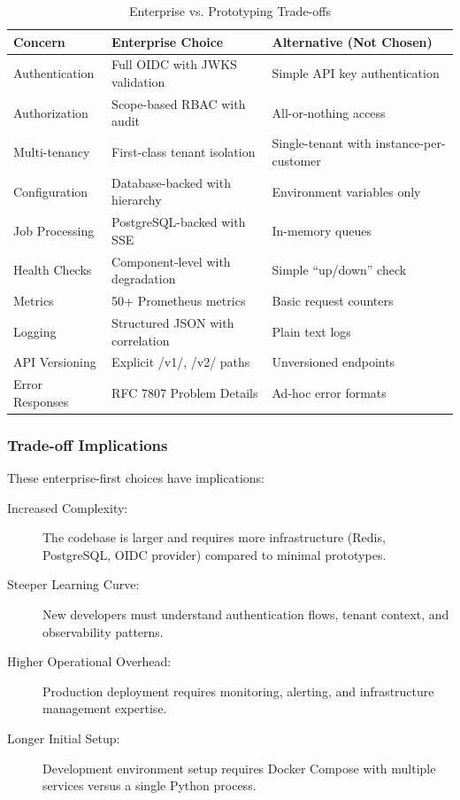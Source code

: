\documentclass[a4paper,twoside]{sapthesis}
\begin{document}
\begin{table}[htbp]
\centering
\caption{Enterprise vs. Prototyping Trade-offs}
\label{tab:enterprise-tradeoffs}
\small
\begin{tabularx}{\textwidth}{|l|X|X|}
\hline
\textbf{Concern} & \textbf{Enterprise Choice} & \textbf{Alternative (Not Chosen)} \\
\midrule
Authentication & Full OIDC with JWKS validation & Simple API key authentication \\
\midrule
Authorization & Scope-based RBAC with audit & All-or-nothing access \\
\midrule
Multi-tenancy & First-class tenant isolation & Single-tenant with instance-per-customer \\
\midrule
Configuration & Database-backed with hierarchy & Environment variables only \\
\midrule
Job Processing & PostgreSQL-backed with SSE & In-memory queues \\
\midrule
Health Checks & Component-level with degradation & Simple ``up/down'' check \\
\midrule
Metrics & 50+ Prometheus metrics & Basic request counters \\
\midrule
Logging & Structured JSON with correlation & Plain text logs \\
\midrule
API Versioning & Explicit /v1/, /v2/ paths & Unversioned endpoints \\
\midrule
Error Responses & RFC 7807 Problem Details & Ad-hoc error formats \\
\midrule
\end{tabularx}
\end{table}

\subsubsection{Trade-off Implications}

These enterprise-first choices have implications:

\begin{description}
    \item[Increased Complexity:] The codebase is larger and requires more infrastructure (Redis, PostgreSQL, OIDC provider) compared to minimal prototypes.
    
    \item[Steeper Learning Curve:] New developers must understand authentication flows, tenant context, and observability patterns.
    
    \item[Higher Operational Overhead:] Production deployment requires monitoring, alerting, and infrastructure management expertise.
    
    \item[Longer Initial Setup:] Development environment setup requires Docker Compose with multiple services versus a single Python process.
\end{description}
\end{document}
